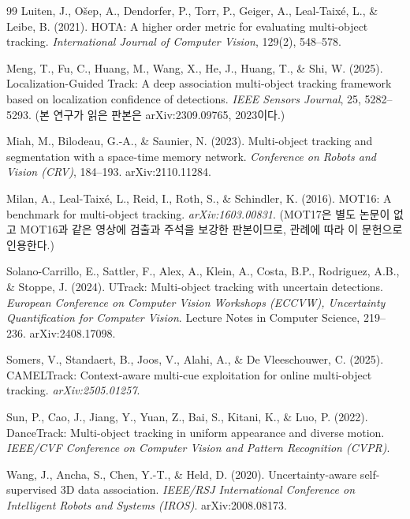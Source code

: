 \documentclass[12pt,a4paper,oneside]{report}
\begin{document}
\begin{thebibliography}{99}
Luiten, J., O\v{s}ep, A., Dendorfer, P., Torr, P., Geiger, A., Leal-Taix\'e, L., \& Leibe, B. (2021).
HOTA: A higher order metric for evaluating multi-object tracking.
\textit{International Journal of Computer Vision}, 129(2), 548--578.

Meng, T., Fu, C., Huang, M., Wang, X., He, J., Huang, T., \& Shi, W. (2025).
Localization-Guided Track: A deep association multi-object tracking framework based on localization confidence of detections.
\textit{IEEE Sensors Journal}, 25, 5282--5293.
(본 연구가 읽은 판본은 arXiv:2309.09765, 2023이다.)

Miah, M., Bilodeau, G.-A., \& Saunier, N. (2023).
Multi-object tracking and segmentation with a space-time memory network.
\textit{Conference on Robots and Vision (CRV)}, 184--193. arXiv:2110.11284.

Milan, A., Leal-Taix\'e, L., Reid, I., Roth, S., \& Schindler, K. (2016).
MOT16: A benchmark for multi-object tracking.
\textit{arXiv:1603.00831}.
(MOT17은 별도 논문이 없고 MOT16과 같은 영상에 검출과 주석을 보강한 판본이므로, 관례에 따라 이 문헌으로 인용한다.)

Solano-Carrillo, E., Sattler, F., Alex, A., Klein, A., Costa, B.P., Rodriguez, A.B., \& Stoppe, J. (2024).
UTrack: Multi-object tracking with uncertain detections.
\textit{European Conference on Computer Vision Workshops (ECCVW), Uncertainty Quantification for Computer Vision}. Lecture Notes in Computer Science, 219--236. arXiv:2408.17098.

Somers, V., Standaert, B., Joos, V., Alahi, A., \& De Vleeschouwer, C. (2025).
CAMELTrack: Context-aware multi-cue exploitation for online multi-object tracking.
\textit{arXiv:2505.01257}.

Sun, P., Cao, J., Jiang, Y., Yuan, Z., Bai, S., Kitani, K., \& Luo, P. (2022).
DanceTrack: Multi-object tracking in uniform appearance and diverse motion.
\textit{IEEE/CVF Conference on Computer Vision and Pattern Recognition (CVPR)}.

Wang, J., Ancha, S., Chen, Y.-T., \& Held, D. (2020).
Uncertainty-aware self-supervised 3D data association.
\textit{IEEE/RSJ International Conference on Intelligent Robots and Systems (IROS)}. arXiv:2008.08173.


\end{thebibliography}
\end{document}
